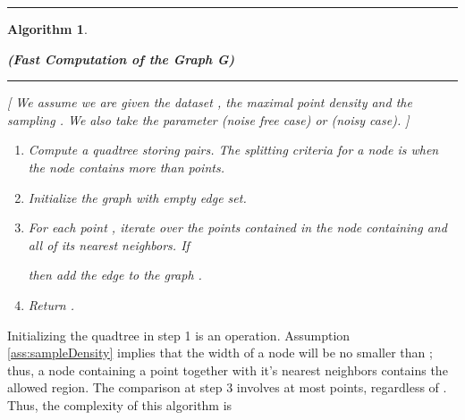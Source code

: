 \documentclass{article}
\newtheorem{algo}{Algorithm}
\numberwithin{cntr}{section}
\numberwithin{equation}{section}
\begin{document}
\hrule
\begin{algo}
  \label{algo:polygonalization}
  \begin{center} {\bf (Fast Computation of the Graph G)}
  \end{center}

\vspace{.1in}

\hrule

\vspace{.2in}

[ We assume we are given the dataset , the maximal point density  and the sampling . We also take the parameter  (noise free case) or  (noisy case). ]

\vspace{.1in}

  \begin{enumerate}
  \item Compute a quadtree  storing  pairs. The splitting criteria for a node is when the node contains more than  points.
  \item Initialize the graph  with empty edge set.
  \item For each point , iterate over the points  contained in the node containing  and all of its nearest neighbors. If
    
    then add the edge  to the graph .
  \item Return .
  \end{enumerate}
\end{algo}
Initializing the quadtree in step 1 is an  operation. Assumption \ref{ass:sampleDensity} implies that the width of a node will be no smaller than ; thus, a node containing a point  together with it's nearest neighbors contains the allowed region. The comparison at step 3 involves at most  points, regardless of . Thus, the complexity of this algorithm is
\end{document}
